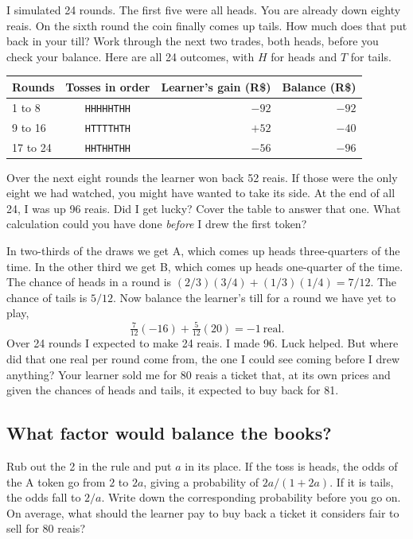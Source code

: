 \documentclass[12pt,oneside]{article}
\newcommand{\secao}[1]{\Needspace{5.2\baselineskip}\subsection*{#1}}
\begin{document}
I simulated 24 rounds. The first five were all heads. You are already down eighty reais. On the sixth round the coin finally comes up tails. How much does that put back in your till? Work through the next two trades, both heads, before you check your balance. Here are all 24 outcomes, with $H$ for heads and $T$ for tails.
\begin{center}
{\small
\begin{tabular}{@{}lcrr@{}}
\toprule
Rounds & Tosses in order & Learner's gain (R\$) & Balance (R\$) \\
\midrule
1 to 8 & \texttt{HHHHHTHH} & $-92$ & $-92$ \\
9 to 16 & \texttt{HTTTTHTH} & $+52$ & $-40$ \\
17 to 24 & \texttt{HHTHHTHH} & $-56$ & $-96$ \\
\bottomrule
\end{tabular}}
\end{center}
Over the next eight rounds the learner won back 52 reais. If those were the only eight we had watched, you might have wanted to take its side. At the end of all 24, I was up 96 reais. Did I get lucky? Cover the table to answer that one. What calculation could you have done \emph{before} I drew the first token?

In two-thirds of the draws we get A, which comes up heads three-quarters of the time. In the other third we get B, which comes up heads one-quarter of the time. The chance of heads in a round is $(2/3)(3/4)+(1/3)(1/4)=7/12$. The chance of tails is $5/12$. Now balance the learner's till for a round we have yet to play,
\[
    \tfrac{7}{12}(-16)+\tfrac{5}{12}(20)=-1\ \text{real}.
\]
Over 24 rounds I expected to make 24 reais. I made 96. Luck helped. But where did that one real per round come from, the one I could see coming before I drew anything? Your learner sold me for 80 reais a ticket that, at its own prices and given the chances of heads and tails, it expected to buy back for 81.

\secao{What factor would balance the books?}
Rub out the 2 in the rule and put $a$ in its place. If the toss is heads, the odds of the A token go from $2$ to $2a$, giving a probability of $2a/(1+2a)$. If it is tails, the odds fall to $2/a$. Write down the corresponding probability before you go on. On average, what should the learner pay to buy back a ticket it considers fair to sell for 80 reais?
\end{document}
